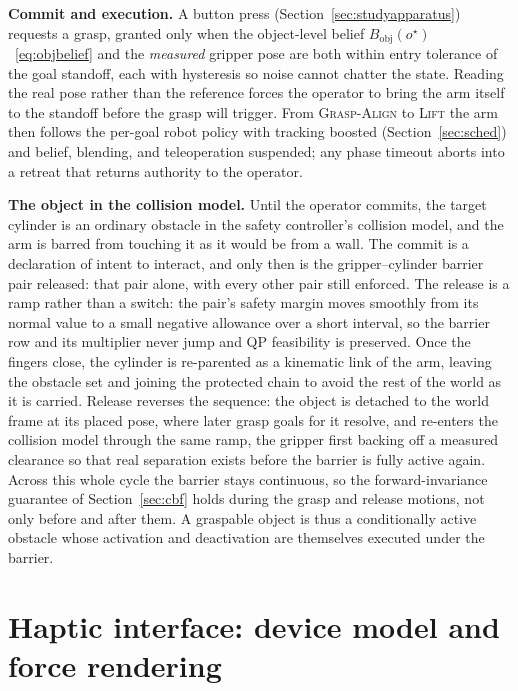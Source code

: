 \documentclass[12pt,a4paper,twoside,openright]{report}
\begin{document}
\textbf{Commit and execution.} A button press (Section~\ref{sec:studyapparatus}) requests a grasp, granted only when the object-level belief $B_{\text{obj}}(o^{\star})$~\eqref{eq:objbelief} and the \emph{measured} gripper pose are both within entry tolerance of the goal standoff, each with hysteresis so noise cannot chatter the state. Reading the real pose rather than the reference forces the operator to bring the arm itself to the standoff before the grasp will trigger. From \textsc{Grasp-Align} to \textsc{Lift} the arm then follows the per-goal robot policy with tracking boosted (Section~\ref{sec:sched}) and belief, blending, and teleoperation suspended; any phase timeout aborts into a retreat that returns authority to the operator.

\textbf{The object in the collision model.} Until the operator commits, the target cylinder is an ordinary obstacle in the safety controller's collision model, and the arm is barred from touching it as it would be from a wall. The commit is a declaration of intent to interact, and only then is the gripper--cylinder barrier pair released: that pair alone, with every other pair still enforced. The release is a ramp rather than a switch: the pair's safety margin moves smoothly from its normal value to a small negative allowance over a short interval, so the barrier row and its multiplier never jump and QP feasibility is preserved. Once the fingers close, the cylinder is re-parented as a kinematic link of the arm, leaving the obstacle set and joining the protected chain to avoid the rest of the world as it is carried. Release reverses the sequence: the object is detached to the world frame at its placed pose, where later grasp goals for it resolve, and re-enters the collision model through the same ramp, the gripper first backing off a measured clearance so that real separation exists before the barrier is fully active again. Across this whole cycle the barrier stays continuous, so the forward-invariance guarantee of Section~\ref{sec:cbf} holds during the grasp and release motions, not only before and after them. A graspable object is thus a conditionally active obstacle whose activation and deactivation are themselves executed under the barrier.

\section{Haptic interface: device model and force rendering}
\label{sec:teleop}
\end{document}
